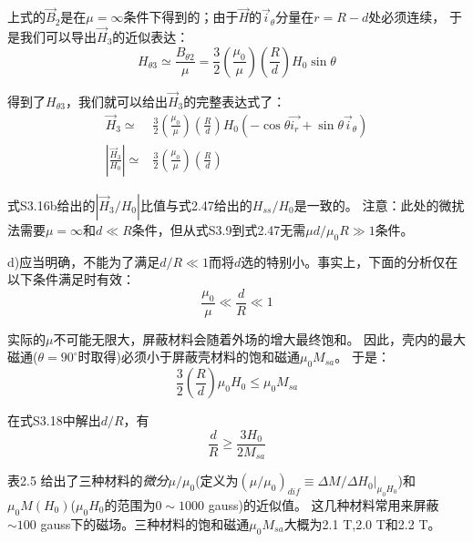 上式的$\vec{B}_2$是在$\mu=\infty$条件下得到的；由于$\vec{H}$的$\vec{i}_\theta$分量在$r=R-d$处必须连续，
于是我们可以导出$\vec{H}_3$的近似表达：
\begin{equation*}
H_{\theta 3}\simeq \frac{B_{\theta 2}}{\mu}=\frac{3}{2}\left(\frac{\mu_0}{\mu}\right)\left(\frac{R}{d}\right)H_0\sin\theta \tag{S3.15}
\end{equation*}

得到了$H_{\theta 3}$，我们就可以给出$\vec{H}_3$的完整表达式了：
\begin{align}
\vec{H}_3\simeq &\frac{3}{2}\left(\frac{\mu_0}{\mu}\right)\left(\frac{R}{d}\right)H_0(-\cos\theta\vec{i_r}+\sin\theta\vec{i}_\theta) \nonumber\tag{S3.16a}\\
\left|\frac{\vec{H}_3}{H_0}\right|\simeq& \frac{3}{2}\left(\frac{\mu_0}{\mu}\right)\left(\frac{R}{d}\right) \nonumber\tag{S3.16b}
\end{align}

式S3.16b给出的$\left|{\vec{H}_3}/{H_0}\right|$比值与式2.47给出的$H_{ss}/H_0$是一致的。
注意：此处的微扰法需要$\mu=\infty$和$d\ll R$条件，但从式S3.9到式2.47无需$\mu d/\mu_0 R \gg 1$条件。

d)应当明确，不能为了满足$d/R \ll 1$而将$d$选的特别小。事实上，下面的分析仅在以下条件满足时有效：
\begin{equation*}
\frac{\mu_0}{\mu} \ll \frac{d}{R} \ll 1 \tag{S3.17}
\end{equation*}

实际的$\mu$不可能无限大，屏蔽材料会随着外场的增大最终饱和。
因此，壳内的最大磁通($\theta=90^\circ$时取得)必须小于屏蔽壳材料的饱和磁通$\mu_0 M_{sa}$。
于是：
\begin{equation*}
\frac{3}{2}\left(\frac{R}{d}\right)\mu_0 H_0 \le \mu_0 M_{sa}  \tag{S3.18}
\end{equation*}

在式S3.18中解出$d/R$，有
\begin{equation*}
\frac{d}{R}\ge \frac{3H_0}{2M_{sa}}  \tag{2.48}
\end{equation*}

表2.5 给出了三种材料的\textit{微分}$\mu/\mu_0$(定义为$(\mu/\mu_0)_{dif}\equiv \Delta M/ \Delta H_0 |_{\mu_0 H_0}$)和$\mu_0M(H_0)$($\mu_0 H_0$的范围为$0\sim 1000$ gauss)的近似值。
这几种材料常用来屏蔽$\sim 100$ gauss下的磁场。三种材料的饱和磁通$\mu_0 M_{sa}$大概为2.1 T,2.0 T和2.2 T。

